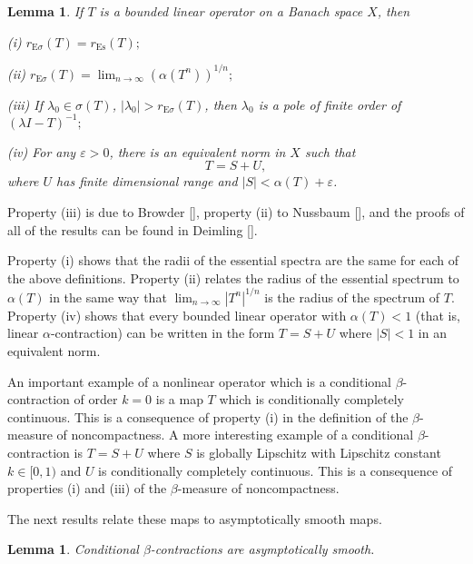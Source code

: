 \documentclass{surv-l}
\theoremstyle{plain}
\newtheorem{lemma}[theorem]{Lemma}
\theoremstyle{definition}
\numberwithin{equation}{section}
\numberwithin{figure}{chapter}
\begin{document}
\begin{lemma}\label{lem2.3.3} If $T$ is a bounded linear operator on a Banach space $X$, then

\emph{(i)} $r_{\mathrm{E}\sigma}(T)=r_{\mathrm{Es}}(T);$

\emph{(ii)} $r_{\mathrm{E}\sigma}(T)= \lim_{n\rightarrow\infty}(\alpha(T^{n}))^{1/n};$

\emph{(iii)} If $\lambda_{0}\in\sigma(T)$, $|\lambda_{0}|>r_{\mathrm{E}\sigma}(T)$, then $\lambda_{0}$ is a pole of finite order of $(\lambda I-T)^{-1};$

\emph{(iv)} For any $\varepsilon >0$, there is an equivalent norm in $X$ such that
\begin{equation*}
T=S+U,
\end{equation*}
where $U$ has finite dimensional range and $|S| <\alpha(T)+\varepsilon$.
\end{lemma}

Property (iii) is due to Browder [\citeyear{1961b}], property (ii) to Nussbaum [\citeyear{1970n}], and the proofs of all of the results can be found in Deimling [\citeyear{1985d}].

Property (i) shows that the radii of the essential spectra are the same for each of the above definitions. Property (ii) relates the radius of the essential spectrum to $\alpha(T)$ in the same way that $ \lim_{n\rightarrow\infty}|T^{n}|^{1/n}$ is the radius of the spectrum of $T$. Property (iv) shows that every bounded linear operator with $\alpha(T)<1$ (that is, linear $\alpha$-contraction) can be written in the form $T=S+U$ where $|S| <1$ in an equivalent norm.

An important example of a nonlinear operator which is a conditional $\beta$-contraction of order $k=0$ is a map $T$ which is conditionally completely continuous. This is a consequence of property (i) in the definition of the $\beta$-measure of noncompactness. A more interesting example of a conditional $\beta$-contraction is $T=S+U$ where $S$ is globally Lipschitz with Lipschitz constant $k\in[0, 1)$ and $U$ is conditionally completely continuous. This is a consequence of properties (i) and (iii) of the $\beta$-measure of noncompactness.

The next results relate these maps to asymptotically smooth maps.

\begin{lemma}\label{lem2.3.4} Conditional $\beta$-contractions are asymptotically smooth.
\end{lemma}
\end{document}
